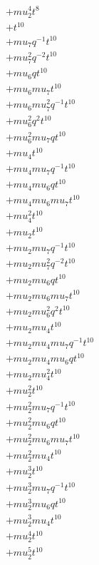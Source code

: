 \begin{align*}
  + mu_2^{4} t^{8} \\
  + t^{10} \\
  + mu_7 q^{-1} t^{10} \\
  + mu_7^{2} q^{-2} t^{10} \\
  + mu_6 q t^{10} \\
  + mu_6 mu_7 t^{10} \\
  + mu_6 mu_7^{2} q^{-1} t^{10} \\
  + mu_6^{2} q^{2} t^{10} \\
  + mu_6^{2} mu_7 q t^{10} \\
  + mu_4 t^{10} \\
  + mu_4 mu_7 q^{-1} t^{10} \\
  + mu_4 mu_6 q t^{10} \\
  + mu_4 mu_6 mu_7 t^{10} \\
  + mu_4^{2} t^{10} \\
  + mu_2 t^{10} \\
  + mu_2 mu_7 q^{-1} t^{10} \\
  + mu_2 mu_7^{2} q^{-2} t^{10} \\
  + mu_2 mu_6 q t^{10} \\
  + mu_2 mu_6 mu_7 t^{10} \\
  + mu_2 mu_6^{2} q^{2} t^{10} \\
  + mu_2 mu_4 t^{10} \\
  + mu_2 mu_4 mu_7 q^{-1} t^{10} \\
  + mu_2 mu_4 mu_6 q t^{10} \\
  + mu_2 mu_4^{2} t^{10} \\
  + mu_2^{2} t^{10} \\
  + mu_2^{2} mu_7 q^{-1} t^{10} \\
  + mu_2^{2} mu_6 q t^{10} \\
  + mu_2^{2} mu_6 mu_7 t^{10} \\
  + mu_2^{2} mu_4 t^{10} \\
  + mu_2^{3} t^{10} \\
  + mu_2^{3} mu_7 q^{-1} t^{10} \\
  + mu_2^{3} mu_6 q t^{10} \\
  + mu_2^{3} mu_4 t^{10} \\
  + mu_2^{4} t^{10} \\
  + mu_2^{5} t^{10}
\end{align*}
